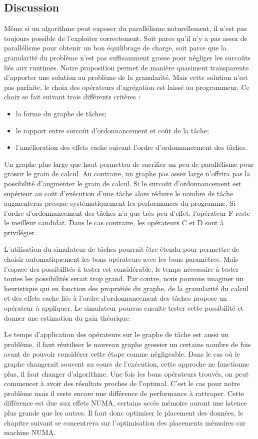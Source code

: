 \subsection{Discussion}
Même si un algorithme peut exposer du parallélisme naturellement, il n'est pas toujours possible de l'exploiter correctement.
%
Soit parce qu'il n'y a pas assez de parallélisme pour obtenir un bon équilibrage de charge, soit parce que la granularité du problème n'est pas suffisamment grosse pour négliger les surcoûts liés aux runtimes.
%
Notre proposition permet de manière quasiment transparente d'apporter une solution au problème de la granularité.
%
Mais cette solution n'est pas parfaite, le choix des opérateurs d'agrégation est laissé au programmeur.
%
Ce choix se fait suivant trois différents critères :
\begin{itemize}
  \item la forme du graphe de tâches;
  \item le rapport entre surcoût d'ordonnancement et coût de la tâche;
  \item l'amélioration des effets cache suivant l'ordre d'ordonnancement des tâches.
\end{itemize}
%
Un graphe plus large que haut permettra de sacrifier un peu de parallélisme pour grossir le grain de calcul.
%
Au contraire, un graphe pas assez large n'offrira pas la possibilité d'augmenter le grain de calcul.
%
Si le surcoût d'ordonnancement est supérieur au coût d'exécution d'une tâche alors réduire le nombre de tâche augmenteras presque systématiquement les performances du programme.
%
Si l'ordre d'ordonnancement des tâches n'a que très peu d'effet, l'opérateur F reste le meilleur candidat.
%
Dans le cas contraire, les opérateurs C et D sont à privilégier.



L'utilisation du simulateur de tâches pourrait être étendu pour permettre de choisir automatiquement les bons opérateurs avec les bons paramètres.
%
Mais l'espace des possibilités à tester est considérable, le temps nécessaire à tester toutes les possibilités serait trop grand.
%
Par contre, nous pouvons imaginer un heuristique qui en fonction des propriétés du graphe, de la granularité du calcul et des effets cache liés à l'ordre d'ordonnancement des tâches propose un opérateur à appliquer.
%
Le simulateur pourras ensuite tester cette possibilité et donner une estimation du gain théorique.



Le temps d'application des opérateurs sur le graphe de tâche est aussi un problème, il faut réutiliser le nouveau graphe grossier un certains nombre de fois avant de pouvoir considérer cette étape comme négligeable.
%
Dans le cas où le graphe changerait souvent au cours de l'exécution, cette approche ne fonctionne plus, il faut changer d'algorithme.
%
Une fois les bons opérateurs trouvés, on peut commencer à avoir des résultats proches de l'optimal.
%
C'est le cas pour notre problème mais il reste encore une différence de performance à rattraper.
%
Cette différence est due aux effets NUMA, certains accès mémoire auront une latence plus grande que les autres.
%
Il faut donc optimiser le placement des données, le chapitre suivant se concentrera sur l'optimisation des placements mémoires sur machine NUMA.
